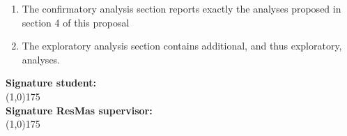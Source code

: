 \documentclass[12pt,a4paper]{article}
\begin{document}
\begin{enumerate}
\item The confirmatory analysis section reports exactly the analyses proposed in section 4 of this proposal
\item The exploratory analysis section contains additional, and thus exploratory, analyses. 
\end{enumerate}

\textbf{Signature student:} 
\vspace*{2\baselineskip} \\
\line(1,0){175} \\

\textbf{Signature ResMas supervisor:}
\vspace*{2\baselineskip} \\
\line(1,0){175} \\

%
\end{document}

